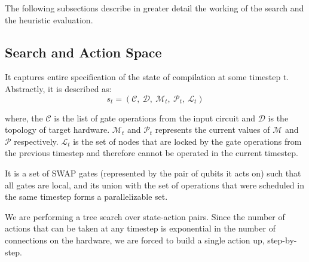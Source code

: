 \documentclass[%
 reprint,
amsmath,amssymb,
pra,
]{revtex4-2}
\begin{document}

The following subsections describe in greater detail the working of the search and the heuristic evaluation.

\subsection{\label{sec:method-state} Search and Action Space}

\begin{defn}[State]
    It captures entire specification of the state of compilation at some timestep t. Abstractly, it is described as:
    \begin{equation*}
        s_{t} = (\mathcal{C},\ \mathcal{D}, \ \mathcal{M}_{t},\ \mathcal{P}_{t},\ \mathcal{L}_{t})
    \end{equation*}

    where, the $\mathcal{C}$ is the list of gate operations from the input circuit and  $\mathcal{D}$ is the topology of target hardware. $\mathcal{M}_t$ and $\mathcal{P}_t$ represents the current values of $\mathcal{M}$ and $\mathcal{P}$ respectively. $\mathcal{L}_{t}$ is the set of nodes that are locked by the gate operations from the previous timestep and therefore cannot be operated in the current timestep. 
\end{defn}


\begin{defn}[Action]
    It is a set of SWAP gates (represented by the pair of qubits it acts on) such that all gates are local, and its union with the set of operations that were scheduled in the same timestep forms a parallelizable set.
\end{defn}

We are performing a tree search over state-action pairs. Since the number of actions that can be taken at any timestep is exponential in the number of connections on the hardware, we are forced to build a single action up, step-by-step. 
\end{document}
